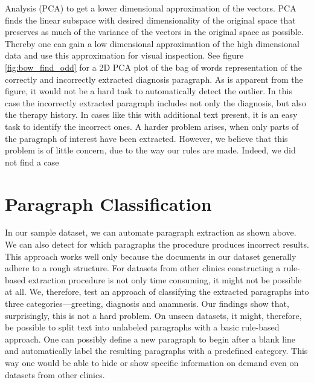 Analysis (PCA) to get a lower dimensional approximation of the vectors. PCA finds the linear
subspace with desired dimensionality of the original space that preserves as much of the variance of the vectors in the original space as possible. Thereby one can gain a low dimensional approximation of the high dimensional data and use this approximation for visual inspection.
See figure \ref{fig:bow_find_odd} for a 2D PCA plot of the bag of words representation
of the correctly and incorrectly extracted diagnosis paragraph. As is apparent from the figure, it would not be a
hard task to automatically detect the outlier. In this case the incorrectly
extracted paragraph includes not only the diagnosis, but also the
therapy history. In cases like this with additional text present, it is an easy task to
identify the incorrect ones. A harder problem arises, when only parts
of the paragraph of interest have been extracted. However, we believe
that this problem is of little concern, due to the way our rules are made.
Indeed, we did not find a case





\section{Paragraph Classification}
In our sample dataset, we can automate paragraph extraction as shown above. We can also detect for which paragraphs the procedure produces incorrect results. This approach works well only because the documents in our dataset generally adhere to a rough structure. For datasets from other clinics constructing a rule-based extraction procedure is not only time consuming, it might not be possible at all. We, therefore, test an approach of classifying the extracted paragraphs into three categories---greeting, diagnosis and anamnesis. Our findings show that, surprisingly, this is not a hard problem. On unseen datasets, it might, therefore, be possible to split text into unlabeled paragraphs with a basic rule-based approach. One can possibly define a new paragraph to begin after a blank line and automatically label the resulting paragraphs with a predefined category. This way one would be able to hide or show specific information on demand even on datasets from other clinics.

